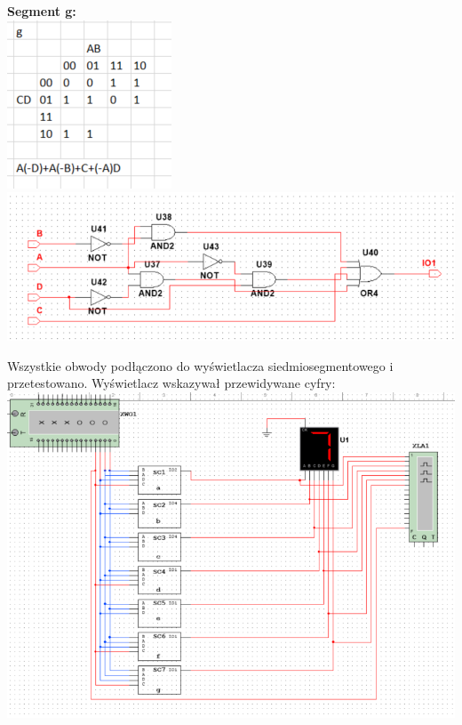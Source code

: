 \documentclass[12pt,a4paper]{article}
\begin{document}
\textbf{Segment g:}\\
\includegraphics[scale=0.8]{7seg/seg6}\\
\includegraphics[scale=1]{7seg/seg6circ}\\
\raggedright

Wszystkie obwody podłączono do wyświetlacza siedmiosegmentowego i przetestowano. Wyświetlacz wskazywał przewidywane cyfry:
\centering
\includegraphics[width=\textwidth]{7seg/7segall}
\end{document}
